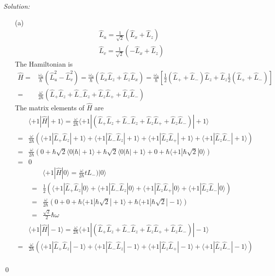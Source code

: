 \documentclass[12pt,a4paper]{article}
\newenvironment{sol}
    {\emph{Solution:}
    }
    {
    \qed
    }
\begin{document}
\begin{sol}
\begin{itemize}
\item[(a)]
\begin{gather}
\hat{L}_u=\frac{1}{\sqrt{2}}(\hat{L}_x+\hat{L}_z)\\
\hat{L}_v=\frac{1}{\sqrt{2}}(-\hat{L}_x+\hat{L}_z)
\end{gather}
The Hamiltonian is
\begin{align}
\nonumber\hat{H}=&\frac{\omega_0}{\hbar}(\hat{L}_u^2-\hat{L}_v^2)=\frac{\omega_0}{\hbar}(\hat{L}_x\hat{L}_z+\hat{L}_z\hat{L}_x)=\frac{\omega_0}{\hbar}[\frac{1}{2}(\hat{L}_++\hat{L}_-)\hat{L}_z+\hat{L}_z\frac{1}{2}(\hat{L}_++\hat{L}_-)]\\
\nonumber=&\frac{\omega}{2\hbar}(\hat{L}_+\hat{L}_z+\hat{L}_-\hat{L}_z+\hat{L}_z\hat{L}_++\hat{L}_z\hat{L}_-)
\end{align}
The matrix elements of $\hat{H}$ are
\begin{align}
\nonumber&\langle+1|\hat{H}|+1\rangle=\frac{\omega}{2\hbar}\langle+1|(\hat{L}_+\hat{L}_z+\hat{L}_-\hat{L}_z+\hat{L}_z\hat{L}_++\hat{L}_z\hat{L}_-)|+1\rangle\\
\nonumber=&\frac{\omega}{2\hbar}(\langle+1|\hat{L}_+\hat{L}_z|+1\rangle+\langle+1|\hat{L}_-\hat{L}_z|+1\rangle+\langle+1|\hat{L}_z\hat{L}_+|+1\rangle+\langle+1|\hat{L}_z\hat{L}_-|+1\rangle)\\
\nonumber=&\frac{\omega}{2\hbar}(0+\hbar\sqrt{2}\langle0|\hbar|+1\rangle+\hbar\sqrt{2}\langle0|\hbar|+1\rangle+0+\hbar\langle+1|\hbar\sqrt{2}|0\rangle)\\
=&0
\end{align}
\begin{align}
\nonumber&\langle+1|\hat{H}|0\rangle=\frac{\omega}{2\hbar}t{L}_-)|0\rangle\\
\nonumber=&\frac{1}{2}(\langle+1|\hat{L}_+\hat{L}_z|0\rangle+\langle+1|\hat{L}_-\hat{L}_z|0\rangle+\langle+1|\hat{L}_z\hat{L}_+|0\rangle+\langle+1|\hat{L}_z\hat{L}_-|0\rangle)\\
\nonumber=&\frac{\omega}{2\hbar}(0+0+\hbar\langle+1|\hbar\sqrt{2}|+1\rangle+\hbar\langle+1|\hbar\sqrt{2}|-1\rangle)\\
=&\frac{\sqrt{2}}{2}\hbar\omega
\end{align}
\begin{align}
\nonumber&\langle+1|\hat{H}|-1\rangle=\frac{\omega}{2\hbar}\langle+1|(\hat{L}_+\hat{L}_z+\hat{L}_-\hat{L}_z+\hat{L}_z\hat{L}_++\hat{L}_z\hat{L}_-)|-1\rangle\\
\nonumber=&\frac{\omega}{2\hbar}(\langle+1|\hat{L}_+\hat{L}_z|-1\rangle+\langle+1|\hat{L}_-\hat{L}_z|-1\rangle+\langle+1|\hat{L}_z\hat{L}_+|-1\rangle+\langle+1|\hat{L}_z\hat{L}_-|-1\rangle)\\

\end{align}
\end{itemize}
\end{sol}
\end{document}
